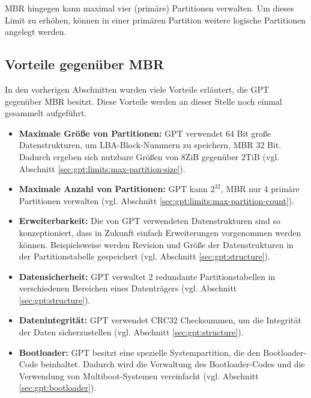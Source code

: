 MBR hingegen kann maximal vier (primäre) Partitionen verwalten.
Um dieses Limit zu erhöhen, können in einer primären Partition weitere logische Partitionen angelegt werden.

\subsection{Vorteile gegenüber MBR}
\label{sec:gpt:advantages}

In den vorherigen Abschnitten wurden viele Vorteile erläutert, die GPT gegenüber MBR besitzt.
Diese Vorteile werden an dieser Stelle noch einmal gesammelt aufgeführt.

\begin{itemize}
    \item \textbf{Maximale Größe von Partitionen:}
    GPT verwendet 64 Bit große Datenstrukturen, um LBA-Block-Nummern zu speichern, MBR 32 Bit.
    Dadurch ergeben sich nutzbare Größen von 8ZiB gegenüber 2TiB (vgl. Abschnitt \ref{sec:gpt:limits:max-partition-size}).

    \item \textbf{Maximale Anzahl von Partitionen:}
    GPT kann $ 2^{32} $, MBR nur 4 primäre Partitionen verwalten (vgl. Abschnitt \ref{sec:gpt:limits:max-partition-count}).

    \item \textbf{Erweiterbarkeit:}
    Die von GPT verwendeten Datenstrukturen sind so konzeptioniert, dass in Zukunft einfach Erweiterungen vorgenommen werden können.
    Beispielsweise werden Revision und Größe der Datenstrukturen in der Partitionstabelle gespeichert (vgl. Abschnitt \ref{sec:gpt:structure}).

    \item \textbf{Datensicherheit:} 
    GPT verwaltet 2 redundante Partitionstabellen in verschiedenen Bereichen eines Datenträgers (vgl. Abschnitt \ref{sec:gpt:structure}).
    
    \item \textbf{Datenintegrität:}
    GPT verwendet CRC32 Checksummen, um die Integrität der Daten sicherzustellen (vgl. Abschnitt \ref{sec:gpt:structure}).

    \item \textbf{Bootloader:}
    GPT besitzt eine spezielle Systempartition, die den Bootloader-Code beinhaltet.
    Dadurch wird die Verwaltung des Bootloader-Codes und die Verwendung von Multiboot-Systemen vereinfacht (vgl. Abschnitt \ref{sec:gpt:bootloader}).

\end{itemize}
